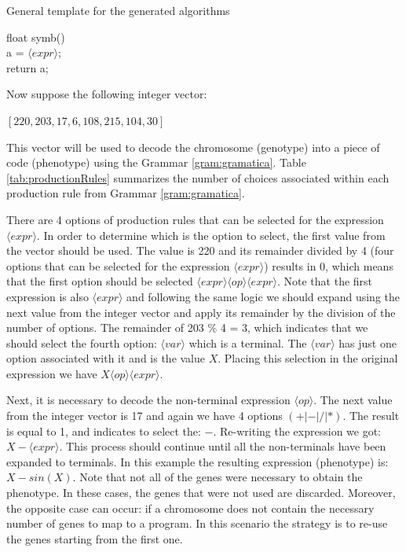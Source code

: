 \documentclass[conference]{IEEEtran}
\begin{document}
\begin{algorithm}
	\caption{General template for the generated algorithms}
	\label{alg:pseudocodigogrammar}
	float symb() { \\
		a = $\langle expr \rangle$;   \\
		return a;  \\
	}	
\end{algorithm}


\noindent
Now suppose the following integer vector:

\begin{center}
	$ [220, 203, 17, 6, 108, 215, 104, 30] $
\end{center}

This vector will be used to decode the chromosome (genotype) into a piece of code (phenotype)  using the Grammar \ref{gram:gramatica}.
Table \ref{tab:productionRules} summarizes the number of choices associated within each production rule from Grammar \ref{gram:gramatica}. 

There are 4 options of production rules that can be selected for the expression $ \langle expr \rangle$. In order to determine which is the option to select, the first value from the vector should be used. The value is 220 and its remainder divided by 4 (four options that can be selected for the expression $ \langle expr \rangle$) results in 0, which means that the first option should be selected $\langle expr \rangle \langle op \rangle \langle expr \rangle$. Note that the first expression is also $ \langle expr \rangle$ and following the same logic we should expand using the next value from the integer vector and apply its remainder by the division of the number of options. The remainder of 203 $\%$ 4 = 3, which indicates that we should select the fourth option: $ \langle var \rangle$ which is a terminal. The $ \langle var \rangle$ has just one option associated with it and is the value $X$. Placing this selection in the original expression we have $X \langle op \rangle \langle expr \rangle$. 

Next, it is necessary to decode the non-terminal expression $\langle op \rangle$. The next value from the integer vector is 17 and again we have 4 options $(+ | - | / | *)$. The result is equal to 1, and indicates to select the: $-$. Re-writing the expression we got:  $X  -  \langle expr \rangle$. This process should continue until all the non-terminals have been expanded to terminals. In this example the resulting expression (phenotype) is: $X - sin (X)$. Note that not all of the genes were necessary to obtain the phenotype. In these cases, the genes that were not used are discarded. Moreover, the opposite case can occur: if a chromosome does not contain the necessary number of genes to map to a program. In this scenario the strategy is to re-use the genes starting from the first one.
\end{document}
